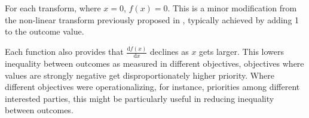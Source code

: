 For each transform, where $x=0$, $f(x)=0$. This is a minor modification from the non-linear transform previously proposed in \cite{rolf_need_2020}, typically achieved by adding 1 to the outcome value.

Each function also provides that $\frac{\mathrm{d} f(x) }{\mathrm{d} x}$ declines as $x$ gets larger. This lowers inequality between outcomes as measured in different objectives, objectives where values are strongly negative get disproportionately higher priority. Where different objectives were operationalizing, for instance, priorities among different interested parties, this might be particularly useful in reducing inequality between outcomes.



\begin{figure}[h]
 

\end{figure}
